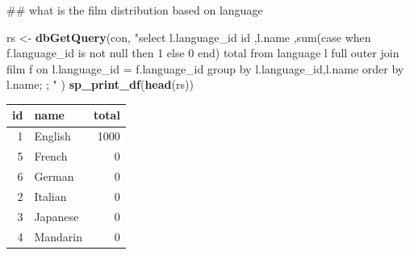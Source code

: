 \documentclass[]{book}
\newenvironment{Shaded}{\begin{snugshade}}{\end{snugshade}}
\newcommand{\KeywordTok}[1]{\textcolor[rgb]{0.13,0.29,0.53}{\textbf{#1}}}
\newcommand{\NormalTok}[1]{#1}
\newcommand{\StringTok}[1]{\textcolor[rgb]{0.31,0.60,0.02}{#1}}
\theoremstyle{definition}
\theoremstyle{definition}
\theoremstyle{definition}
\theoremstyle{remark}
\begin{document}
\begin{Shaded}
\begin{Highlighting}[]
\NormalTok{## what is the film distribution based on language}

\NormalTok{rs <-}\StringTok{ }\KeywordTok{dbGetQuery}\NormalTok{(con,}
                \StringTok{"select l.language_id id}
\StringTok{                       ,l.name}
\StringTok{                       ,sum(case when f.language_id is not null then 1 else 0 end) total}
\StringTok{                   from language l}
\StringTok{                        full outer join film f}
\StringTok{                             on l.language_id = f.language_id}
\StringTok{                  group by l.language_id,l.name }
\StringTok{                  order by l.name;}
\StringTok{                 ;}
\StringTok{                "}
\NormalTok{                )}
\KeywordTok{sp_print_df}\NormalTok{(}\KeywordTok{head}\NormalTok{(rs))}
\end{Highlighting}
\end{Shaded}

\begin{tabular}{r|l|r}
\hline
id & name & total\\
\hline
1 & English & 1000\\
\hline
5 & French & 0\\
\hline
6 & German & 0\\
\hline
2 & Italian & 0\\
\hline
3 & Japanese & 0\\
\hline
4 & Mandarin & 0\\
\hline
\end{tabular}
\end{document}
